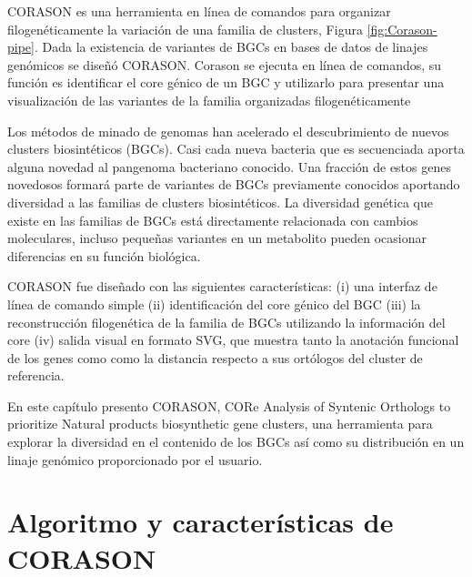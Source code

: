 \documentclass[12pt,twoside]{reedthesis}
\begin{document}
  CORASON es una herramienta en línea de comandos para organizar
  filogenéticamente la variación de una familia de clusters, Figura
  \autoref{fig:Corason-pipe}. Dada la existencia de variantes de BGCs en
  bases de datos de linajes genómicos se diseñó CORASON. Corason se
  ejecuta en línea de comandos, su función es identificar el core génico
  de un BGC y utilizarlo para presentar una visualización de las variantes
  de la familia organizadas filogenéticamente
  
  Los métodos de minado de genomas han acelerado el descubrimiento de
  nuevos clusters biosintéticos (BGCs). Casi cada nueva bacteria que es
  secuenciada aporta alguna novedad al pangenoma bacteriano conocido. Una
  fracción de estos genes novedosos formará parte de variantes de BGCs
  previamente conocidos aportando diversidad a las familias de clusters
  biosintéticos. La diversidad genética que existe en las familias de BGCs
  está directamente relacionada con cambios moleculares, incluso pequeñas
  variantes en un metabolito pueden ocasionar diferencias en su función
  biológica.
  
  CORASON fue diseñado con las siguientes características: (i) una
  interfaz de línea de comando simple (ii) identificación del core génico
  del BGC (iii) la reconstrucción filogenética de la familia de BGCs
  utilizando la información del core (iv) salida visual en formato SVG,
  que muestra tanto la anotación funcional de los genes como como la
  distancia respecto a sus ortólogos del cluster de referencia.
  
  En este capítulo presento CORASON, CORe Analysis of Syntenic Orthologs
  to prioritize Natural products biosynthetic gene clusters, una
  herramienta para explorar la diversidad en el contenido de los BGCs así
  como su distribución en un linaje genómico proporcionado por el usuario.
  
  \section{Algoritmo y características de
  CORASON}\label{algoritmo-y-caracteristicas-de-corason}
  
\end{document}
